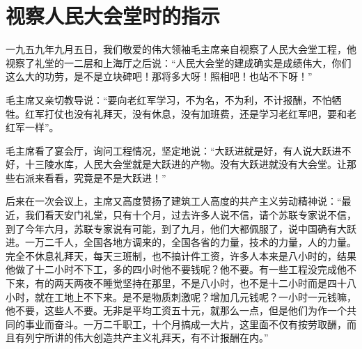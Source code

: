 \section[视察人民大会堂时的指示（一九五九年九月五日）]{视察人民大会堂时的指示}


一九五九年九月五日，我们敬爱的伟大领袖毛主席亲自视察了人民大会堂工程，他视察了礼堂的一二层和上海厅之后说：“人民大会堂的建成确实是成绩伟大，你们这么大的功劳，是不是立块碑吧！那将多大呀！照相吧！也站不下呀！”

毛主席又亲切教导说：“要向老红军学习，不为名，不为利，不计报酬，不怕牺牲。红军打仗也没有礼拜天，没有休息，没有加班费，还是学习老红军吧，要和老红军一样”。

毛主席看了宴会厅，询问工程情况，坚定地说：“大跃进就是好，有人说大跃进不好，十三陵水库，人民大会堂就是大跃进的产物。没有大跃进就没有大会堂。让那些右派来看看，究竟是不是大跃进！”

后来在一次会议上，主席又高度赞扬了建筑工人高度的共产主义劳动精神说：“最近，我们看天安门礼堂，只有十个月，过去许多人说不信，请个苏联专家说不信，到了今年六月，苏联专家说有可能，到了九月，他们大都佩服了，说中国确有大跃进。一万二千人，全国各地方调来的，全国各省的力量，技术的力量，人的力量。完全不休息礼拜天，每天三班制，也不搞计件工资，许多人本来是八小时的，结果他做了十二小时不下工，多的四小时他不要钱呢？他不要。有一些工程没完成他不下来，有的两天两夜不睡觉坚持在那里，不是八小时，也不是十二小时而是四十八小时，就在工地上不下来。是不是物质刺激呢？增加几元钱呢？一小时一元钱嘛，他不要，这些人不要。无非是平均工资五十元，就那么一点，但是他们为作一个共同的事业而奋斗。一万二千职工，十个月搞成一大片，这里面不仅有按劳取酬，而且有列宁所讲的伟大创造共产主义礼拜天，有不计报酬在内。”


